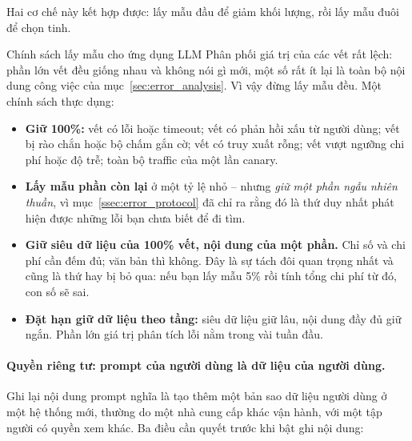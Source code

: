 \noindent Hai cơ chế này kết hợp được: lấy mẫu đầu để giảm khối lượng, rồi lấy mẫu đuôi để chọn tinh.

\begin{keyidea}{Chính sách lấy mẫu cho ứng dụng LLM}
Phân phối giá trị của các vết rất lệch: phần lớn vết đều giống nhau và không nói gì mới, một số rất ít lại là toàn bộ nội dung công việc của mục~\ref{sec:error_analysis}. Vì vậy đừng lấy mẫu đều. Một chính sách thực dụng:

\begin{itemize}
	\item \textbf{Giữ 100\%:} vết có lỗi hoặc timeout; vết có phản hồi xấu từ người dùng; vết bị rào chắn hoặc bộ chấm gắn cờ; vết có truy xuất rỗng; vết vượt ngưỡng chi phí hoặc độ trễ; toàn bộ traffic của một lần canary.
	\item \textbf{Lấy mẫu phần còn lại} ở một tỷ lệ nhỏ -- nhưng \emph{giữ một phần ngẫu nhiên thuần}, vì mục~\ref{ssec:error_protocol} đã chỉ ra rằng đó là thứ duy nhất phát hiện được những lỗi bạn chưa biết để đi tìm.
	\item \textbf{Giữ siêu dữ liệu của 100\% vết, nội dung của một phần.} Chỉ số và chi phí cần đếm đủ; văn bản thì không. Đây là sự tách đôi quan trọng nhất và cũng là thứ hay bị bỏ qua: nếu bạn lấy mẫu 5\% rồi tính tổng chi phí từ đó, con số sẽ sai.
	\item \textbf{Đặt hạn giữ dữ liệu theo tầng:} siêu dữ liệu giữ lâu, nội dung đầy đủ giữ ngắn. Phần lớn giá trị phân tích lỗi nằm trong vài tuần đầu.
\end{itemize}
\end{keyidea}

\paragraph{Quyền riêng tư: prompt của người dùng là dữ liệu của người dùng.} Ghi lại nội dung prompt nghĩa là tạo thêm một bản sao dữ liệu người dùng ở một hệ thống mới, thường do một nhà cung cấp khác vận hành, với một tập người có quyền xem khác. Ba điều cần quyết trước khi bật ghi nội dung:

